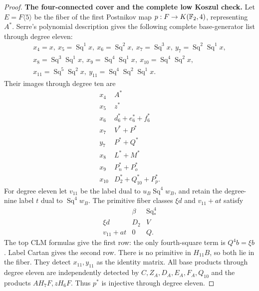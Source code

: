 \begin{proof}
\medskip\noindent
\textbf{The four-connected cover and the complete low Koszul check.}
Let $E=F\langle5\rangle$ be the fiber of the first Postnikov
map $p:F\to K(\mathbb F_2,4)$, representing $A^*$.
Serre's polynomial description \cite[Section 2]{I_Serre1953}
gives the following complete base-generator list through degree eleven:
\[
\begin{gathered}
 x_4=x,\ x_5=\operatorname{Sq}^1x,\ x_6=\operatorname{Sq}^2x,
 \ x_7=\operatorname{Sq}^3x,\ y_7=\operatorname{Sq}^2\operatorname{Sq}^1x,\\
 x_8=\operatorname{Sq}^3\operatorname{Sq}^1x,
 \ x_9=\operatorname{Sq}^4\operatorname{Sq}^1x,
 \ x_{10}=\operatorname{Sq}^4\operatorname{Sq}^2x,\\
 x_{11}=\operatorname{Sq}^5\operatorname{Sq}^2x,
 \ y_{11}=\operatorname{Sq}^4\operatorname{Sq}^2\operatorname{Sq}^1x.
\end{gathered}
\]
Their images through degree ten are
\[
\begin{array}{c|l}
 x_4&A^*\\
 x_5&z^*\\
 x_6&d_6^*+e_6^*+f_6^*\\
 x_7&V^*+P^*\\
 y_7&P^*+Q^*\\
 x_8&L^*+M^*\\
 x_9&P_n^*+P_o^*\\
 x_{10}&D_2^*+Q_{10}^*+P_p^*.
\end{array}
\tag{D.2.22a10}
\]
For degree eleven let $v_{11}$ be the label dual to
$u_B\operatorname{Sq}^4w_B$, and retain the degree-nine label
$t$ dual to $\operatorname{Sq}^4w_B$. The primitive fiber
classes $\xi d$ and $v_{11}+at$ satisfy
\[
\begin{array}{c|cc}
 &\beta&\operatorname{Sq}_*^4\\\hline
 \xi d&D_2&V\\
 v_{11}+at&0&Q.
\end{array}
\tag{D.2.22a11}
\]
The top CLM formulas give the first row: the only fourth-square
term is $Q^4b=\xi b$. Label Cartan gives the second row.
There is no primitive in $H_{11}B$, so both lie in the fiber.
They detect $x_{11},y_{11}$ as the identity matrix.
All base products through degree eleven are independently detected
by $C,Z_A,D_A,E_A,F_A,Q_{10}$ and the products
$AH_7F,zH_6F$. Thus $p^*$ is injective through degree eleven.


\end{proof}
